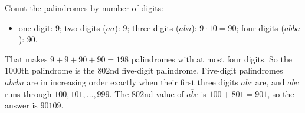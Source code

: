 Count the palindromes by number of digits:
\begin{itemize}
\item one digit: $9$; two digits ($\overline{aa}$): $9$; three digits ($\overline{aba}$): $9\cdot10=90$; four digits ($\overline{abba}$): $90$.
\end{itemize}
That makes $9+9+90+90=198$ palindromes with at most four digits. So the $1000$th palindrome is the $802$nd five-digit palindrome. Five-digit palindromes $\overline{abcba}$ are in increasing order exactly when their first three digits $\overline{abc}$ are, and $\overline{abc}$ runs through $100,101,\dots,999$. The $802$nd value of $\overline{abc}$ is $100+801=901$, so the answer is $\boxed{90109}$.
